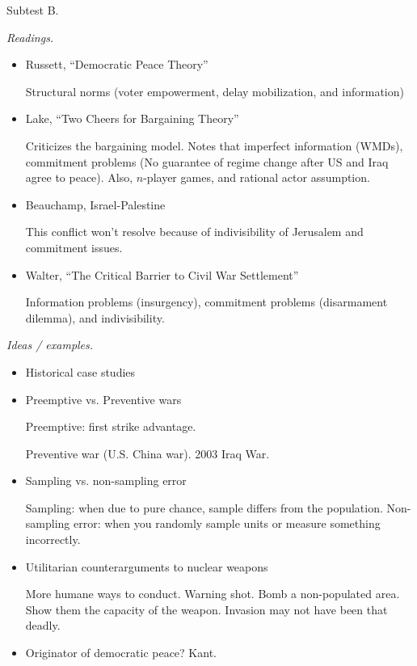 \documentclass{article}
\begin{document}
  \newpage

  Subtest B.

  {\it Readings.}

  \begin{itemize}
    \item Russett, ``Democratic Peace Theory'' 

      Structural norms (voter empowerment, delay mobilization, and information)

    \item Lake, ``Two Cheers for Bargaining Theory''

      Criticizes the bargaining model.  Notes that imperfect information (WMDs), commitment problems (No guarantee of regime change after US and Iraq agree to peace).  Also, $n$-player games, and rational actor assumption.

    \item Beauchamp, Israel-Palestine

      This conflict won't resolve because of indivisibility of Jerusalem and commitment issues.

    \item Walter, ``The Critical Barrier to Civil War Settlement''

      Information problems (insurgency), commitment problems (disarmament dilemma), and indivisibility.


  \end{itemize}

  {\it Ideas / examples.}

  \begin{itemize}
    \item Historical case studies
    \item Preemptive vs. Preventive wars

      Preemptive: first strike advantage.

      Preventive war (U.S. China war).  2003 Iraq War.

    \item Sampling vs. non-sampling error

      Sampling: when due to pure chance, sample differs from the population.  Non-sampling error: when you randomly sample units or measure something incorrectly.

    \item Utilitarian counterarguments to nuclear weapons

      More humane ways to conduct. Warning shot.  Bomb a non-populated area.  Show them the capacity of the weapon. Invasion may not have been that deadly.

    \item Originator of democratic peace? Kant.
  \end{itemize}
\end{document}
